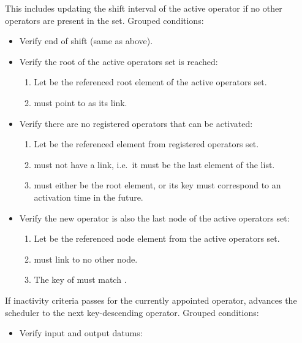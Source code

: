 \documentclass[../midgard.tex]{subfiles}
\begin{document}
\begin{description}
      This includes updating the shift interval of the active operator if no other operators are present in the set.
      Grouped conditions:
      \begin{itemize}
        \item Verify end of shift (same as above).
        \item Verify the root of the active operators set is reached:
          \begin{enumerate}[resume]
            \item Let  be the referenced root element of the active operators set.
            \item {} must point to  as its link.
          \end{enumerate}
        \item Verify there are no registered operators that can be activated:
          \begin{enumerate}[resume]
            \item Let  be the referenced element from registered operators set.
            \item {} must not have a link, i.e.\ it must be the last element of the list.
            \item {} must either be the root element, or its key must correspond to an activation time in the future.
          \end{enumerate}
        \item Verify the new operator is also the last node of the active operators set:
          \begin{enumerate}[resume]
            \item Let  be the referenced node element from the active operators set.
            \item {} must link to no other node.
            \item The key of  must match .
          \end{enumerate}
      \end{itemize}
    \item[Go to Next -- Skipped Operator.] If inactivity criteria passes for the currently appointed operator, advances the scheduler to the next key-descending operator.
      Grouped conditions:
      \begin{itemize}
        \item Verify input and output datums:

\end{itemize}
\end{description}
\end{document}
